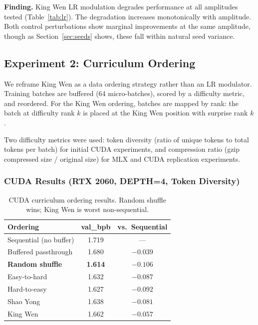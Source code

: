 \documentclass{article}
\begin{document}
\textbf{Finding.} King Wen LR modulation degrades performance at all amplitudes tested (Table~\ref{tab:lr}). The degradation increases monotonically with amplitude. Both control perturbations show marginal improvements at the same amplitude, though as Section~\ref{sec:seeds} shows, these fall within natural seed variance.

\subsection{Experiment 2: Curriculum Ordering}

We reframe King Wen as a data ordering strategy rather than an LR modulator. Training batches are buffered (64 micro-batches), scored by a difficulty metric, and reordered. For the King Wen ordering, batches are mapped by rank: the batch at difficulty rank $k$ is placed at the King Wen position with surprise rank $k$.

Two difficulty metrics were used: token diversity (ratio of unique tokens to total tokens per batch) for initial CUDA experiments, and compression ratio (gzip compressed size / original size) for MLX and CUDA replication experiments.

\subsubsection{CUDA Results (RTX 2060, DEPTH=4, Token Diversity)}

\begin{table}[h]
\centering
\begin{tabular}{lcc}
\toprule
\textbf{Ordering} & \textbf{val\_bpb} & \textbf{vs.\ Sequential} \\
\midrule
Sequential (no buffer) & 1.719 & --- \\
Buffered passthrough & 1.680 & $-0.039$ \\
\textbf{Random shuffle} & \textbf{1.614} & $\mathbf{-0.106}$ \\
Easy-to-hard & 1.632 & $-0.087$ \\
Hard-to-easy & 1.627 & $-0.092$ \\
Shao Yong & 1.638 & $-0.081$ \\
King Wen & 1.662 & $-0.057$ \\
\bottomrule
\end{tabular}
\caption{CUDA curriculum ordering results. Random shuffle wins; King Wen is worst non-sequential.}
\label{tab:cuda}
\end{table}
\end{document}
